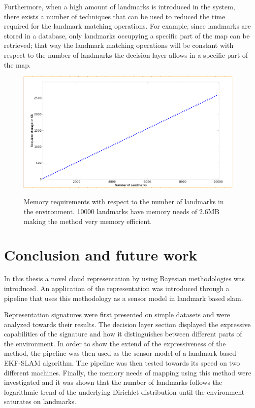 \documentclass[twoside,hidelinks]{article}
\begin{document}
Furthermore, when a high amount of  landmarks is introduced in the system, there exists a number of techniques that can be used to reduced the time required for the landmark matching operations.
For example, since landmarks are stored in a database, only landmarks occupying a specific part of the map can be retrieved;
that way the landmark matching operations will be constant with respect to the number of landmarks the decision layer allows in a specific part of the map. 

\begin{figure}[!ht]
  \centering
  \includegraphics[width=.8\textwidth]{MemoryRequirements} \\
  \caption{Memory requirements with respect to the number of landmarks in the environment. 10000 landmarks have memory needs of 2.6MB making the method very memory efficient.}
  \label{pip:reqs}
\end{figure}


\newpage
\section{Conclusion and future work}
\label{sec:conclusion}

In this thesis a novel cloud representation by using Bayesian methodologies was introduced.
An application of the representation was introduced through a pipeline that uses this methodology as a sensor model in landmark based slam. 

Representation signatures were first presented on simple datasets and were analyzed towards their results. 
The decision layer section displayed the expressive capabilities of the signature and how it distinguishes between different parts of the environment.
In order to show the extend of the expressiveness of the method, the pipeline was then used as the sensor model of a landmark based EKF-SLAM algorithm.
The pipeline was then tested towards its speed on two different machines.
Finally, the memory needs of mapping using this method were investigated and it was shown that the number of landmarks follows the logarithmic trend of the underlying Dirichlet distribution until the environment saturates on landmarks.
\end{document}
